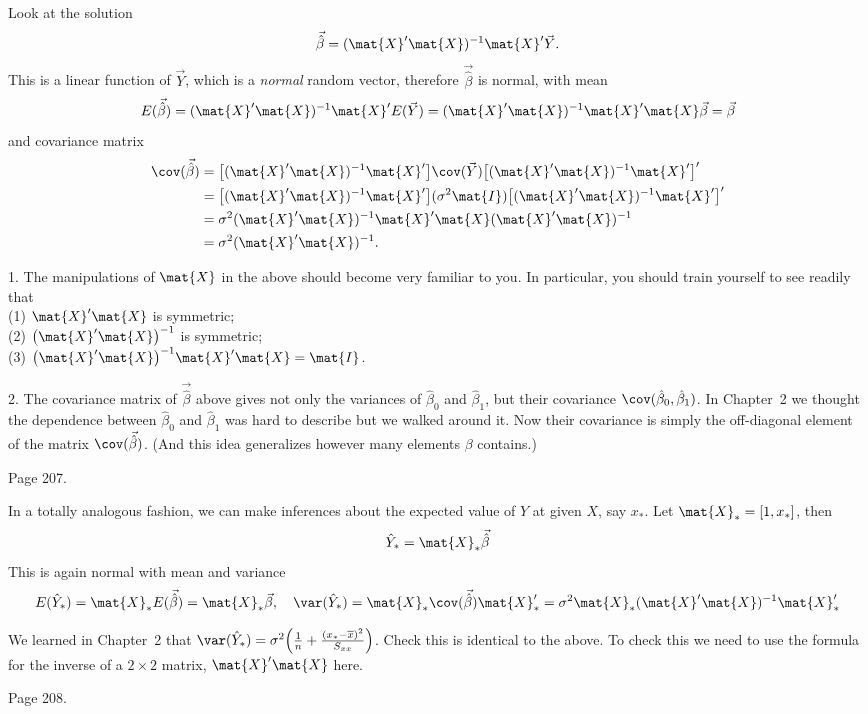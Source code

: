 \documentclass[12pt]{article}
\begin{document}
Look at the solution
\[
\vec{\hat\beta} = (\mat{X}'\mat{X})^{-1}\mat{X}'\vec{Y}
.
\]
This is a linear function of $\vec{Y}$, which is a \emph{normal} random
vector, therefore $\vec{\hat\beta}$ is normal,
with mean
\[
E(\vec{\hat\beta})
= (\mat{X}'\mat{X})^{-1}\mat{X}'E(\vec{Y})
= (\mat{X}'\mat{X})^{-1}\mat{X}'\mat{X}\vec{\beta}
= \vec{\beta}
\]
and covariance matrix
\begin{align*}
\cov(\vec{\hat\beta})
&= \bigl[(\mat{X}'\mat{X})^{-1}\mat{X}'\bigr]
    \cov(\vec{Y})
  \big[(\mat{X}'\mat{X})^{-1}\mat{X}'\bigr]'
\\
&= \bigl[(\mat{X}'\mat{X})^{-1}\mat{X}'\bigr]
  (\sigma^2\mat{I})
  \big[(\mat{X}'\mat{X})^{-1}\mat{X}'\bigr]'
\\
&= \sigma^2
    (\mat{X}'\mat{X})^{-1}\mat{X}'
    \mat{X}(\mat{X}'\mat{X})^{-1}
\\
&= \sigma^2 (\mat{X}'\mat{X})^{-1}
.
\end{align*}

\alert[Remarks]%
1. The manipulations of $\mat{X}$ in the above should become very
familiar to you. In particular, you should train yourself to see readily
that\\
(1) $\mat{X}'\mat{X}$ is symmetric;\\
(2) $\bigl(\mat{X}'\mat{X}\bigr)^{-1}$ is symmetric;\\
(3) $\bigl(\mat{X}'\mat{X}\bigr)^{-1} \mat{X}'\mat{X} = \mat{I}$.

2. The covariance matrix of $\vec{\hat\beta}$ above
gives not only the variances of $\hat\beta_0$ and $\hat\beta_1$,
but their covariance $\cov(\hat\beta_0, \hat\beta_1)$.
In Chapter~2 we thought the dependence between $\hat\beta_0$
and $\hat\beta_1$ was hard to describe but we walked around it.
Now their covariance is simply the
off-diagonal element of the matrix $\cov(\vec{\hat\beta})$.
(And this idea generalizes however many elements
$\beta$ contains.)

\example Page 207.

In a totally analogous fashion,
we can make inferences about the expected value of $Y$ at given $X$,
say $x_*$.
Let $\mat{X}_* = [1, x_*]$,
then
\[
\hat{Y}_* = \mat{X}_* \vec{\hat\beta}
\]
This is again normal with mean and variance
\[
E(\hat{Y}_*)
= \mat{X}_* E(\vec{\hat\beta})
= \mat{X}_* \vec{\beta}
,\quad
\var(\hat{Y}_*)
= \mat{X}_* \cov(\vec{\hat\beta}) \mat{X}_*'
= \sigma^2 \mat{X}_* (\mat{X}'\mat{X})^{-1} \mat{X}_*'
\]

\exercise
We learned in Chapter~2 that
$\var(\hat{Y}_*)
= \sigma^2\Bigl(
    \frac{1}{n} + \frac{(x_* - \overline{x})^2}{S_{xx}}\Bigr)$.
Check this is identical to the above.
To check this we need to use the formula for the inverse of a
$2\times 2$ matrix, $\mat{X}'\mat{X}$ here.

\example Page 208.
\end{document}
